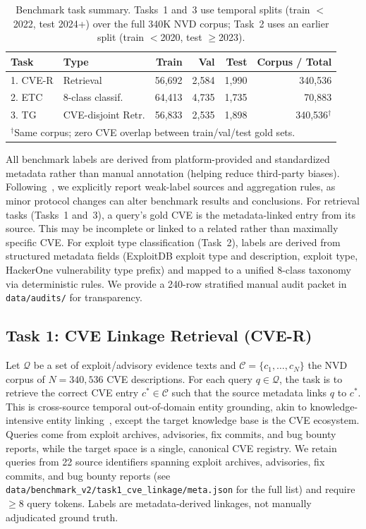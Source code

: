 \documentclass{article}
\begin{document}
\begin{table}[t]
\centering
\small
\caption{Benchmark task summary. Tasks~1 and~3 use temporal splits (train $<$2022, test 2024+) over the full 340K NVD corpus; Task~2 uses an earlier split (train $<$2020, test $\geq$2023).}
\label{tab:task-summary}
\begin{tabular}{llrrrr}
\toprule
\textbf{Task} & \textbf{Type} & \textbf{Train} & \textbf{Val} & \textbf{Test} & \textbf{Corpus / Total} \\
\midrule
1. CVE-R & Retrieval & 56,692 & 2,584 & 1,990 & 340,536 \\
2. ETC & 8-class classif. & 64,413 & 4,735 & 1,735 & 70,883 \\
3. TG & CVE-disjoint Retr. & 56,833 & 2,535 & 1,898 & 340,536$^\dagger$ \\
\bottomrule
\multicolumn{6}{l}{\footnotesize $^\dagger$Same corpus; zero CVE overlap between train/val/test gold sets.}
\end{tabular}
\end{table}

All benchmark labels are derived from platform-provided and standardized metadata rather than manual annotation (helping reduce third-party biases). Following~\citet{zhang2021wrench}, we explicitly report weak-label sources and aggregation rules, as minor protocol changes can alter benchmark results and conclusions. For retrieval tasks (Tasks~1 and~3), a query's gold CVE is the metadata-linked entry from its source. This may be incomplete or linked to a related rather than maximally specific CVE. For exploit type classification (Task~2), labels are derived from structured metadata fields (ExploitDB exploit type and description, exploit type, HackerOne vulnerability type prefix) and mapped to a unified 8-class taxonomy via deterministic rules. We provide a 240-row stratified manual audit packet in \texttt{data/audits/} for transparency.

\subsection{Task 1: CVE Linkage Retrieval (CVE-R)}
\label{sec:task1}

Let $\mathcal{Q}$ be a set of exploit/advisory evidence texts and $\mathcal{C} = \{c_1, \ldots, c_N\}$ the NVD corpus of $N{=}340{,}536$ CVE descriptions. For each query $q \in \mathcal{Q}$, the task is to retrieve the correct CVE entry $c^* \in \mathcal{C}$ such that the source metadata links $q$ to $c^*$. This is cross-source temporal out-of-domain entity grounding, akin to knowledge-intensive entity linking~\citep{petroni2021kilt}, except the target knowledge base is the CVE ecosystem. Queries come from exploit archives, advisories, fix commits, and bug bounty reports, while the target space is a single, canonical CVE registry. We retain queries from 22 source identifiers spanning exploit archives, advisories, fix commits, and bug bounty reports (see \texttt{data/benchmark\_v2/task1\_cve\_linkage/meta.json} for the full list) and require $\geq$8 query tokens. Labels are metadata-derived linkages, not manually adjudicated ground truth. 
\end{document}
